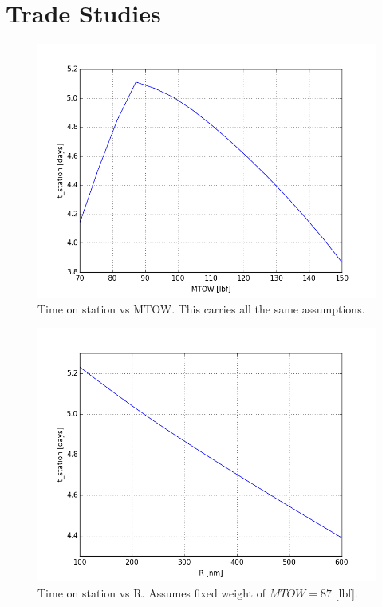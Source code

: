 \documentclass[10pt, a4paper]{article}
\begin{document}
\section*{Trade Studies}

\begin{figure}[h!]
\begin{center}
\includegraphics[scale = .6]{tvsMTOW}
\caption{Time on station vs MTOW.  This carries all the same assumptions.}
\end{center}
\end{figure}

\begin{figure}[h!]
\begin{center}
\includegraphics[scale = .6]{tvsR}
\caption{Time on station vs R. Assumes fixed weight of $MTOW = 87$ [lbf].}
\end{center}
\end{figure}
\end{document}
